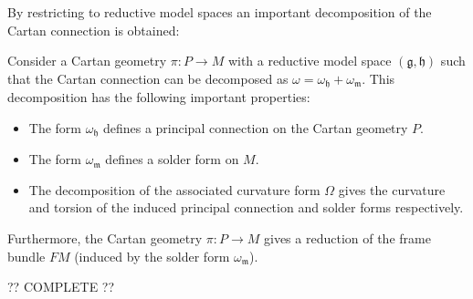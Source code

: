     By restricting to reductive model spaces an important decomposition of the Cartan connection is obtained:
    \begin{property}
        Consider a Cartan geometry $\pi:P\rightarrow M$ with a reductive model space $(\mathfrak{g}, \mathfrak{h})$ such that the Cartan connection can be decomposed as $\omega=\omega_{\mathfrak{h}}+\omega_{\mathfrak{m}}$. This decomposition has the following important properties:
        \begin{itemize}
            \item The form $\omega_{\mathfrak{h}}$ defines a principal connection on the Cartan geometry $P$.
            \item The form $\omega_{\mathfrak{m}}$ defines a solder form on $M$.
            \item The decomposition of the associated curvature form $\Omega$ gives the curvature and torsion of the induced principal connection and solder forms respectively.
        \end{itemize}
        Furthermore, the Cartan geometry $\pi:P\rightarrow M$ gives a reduction of the frame bundle $FM$ (induced by the solder form $\omega_{\mathfrak{m}}$).
    \end{property}
    ?? COMPLETE ??